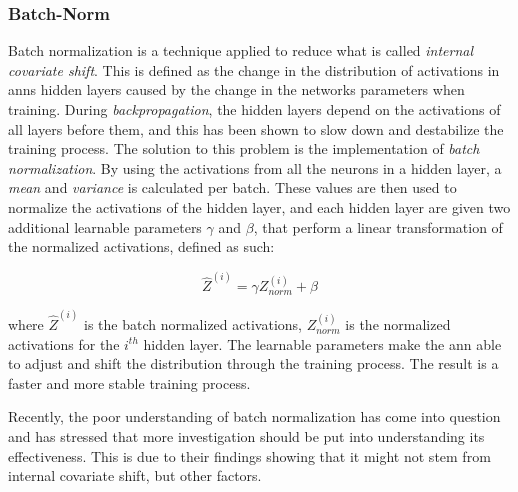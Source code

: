 \subsubsection{Batch-Norm}
    Batch normalization is a technique applied to reduce what is called \textit{internal  covariate shift}\cite{pmlr-v37-ioffe15_batch_norm}. This is defined as the change in the distribution of activations in \gls{ann}s hidden layers caused by the change in the networks parameters when training. During \textit{backpropagation}, the hidden layers depend on the activations of all layers before them, and this has been shown to slow down and destabilize the training process. The solution to this problem is the implementation of \textit{batch normalization}. By using the activations from all the neurons in a hidden layer, a \textit{mean} and \textit{variance} is calculated per batch. These values are then used to normalize the activations of the hidden layer, and each hidden layer are given two additional learnable parameters $\gamma$ and $\beta$, that perform a linear transformation of the normalized activations, defined as such:
    
        \begin{equation} \label{batch_normalization}
            \hat{Z}^{(i)} =   \gamma Z^{(i)}_{norm} + \beta
        \end{equation}
    
    where $\hat{Z}^{(i)}$ is the batch normalized activations, $Z^{(i)}_{norm}$ is the normalized activations for the $i^{th}$ hidden layer. The learnable parameters make the \gls{ann} able to adjust and shift the distribution through the training process. The result is a faster and more stable training process. 
    
    Recently, the poor understanding of batch normalization has come into question and \citet{batch_norm_not_work} has stressed that more investigation should be put into understanding its effectiveness. This is due to their findings showing that it might not stem from internal covariate shift, but other factors. 

